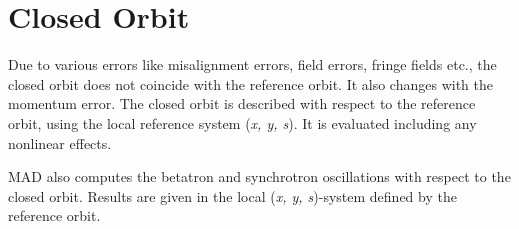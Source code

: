 
\section{Closed Orbit}

Due to various errors like misalignment errors, field errors, fringe
fields etc., the closed orbit does not coincide with the reference
orbit. It also changes with the momentum error. The closed orbit is
described with respect to the reference orbit, using the local
reference system (\textit{x, y, s}). It is evaluated including any
nonlinear effects.  

MAD also computes the betatron and synchrotron oscillations with respect
to the closed orbit. Results are given in the local (\textit{x, y,
  s})-system defined by the reference orbit. 




